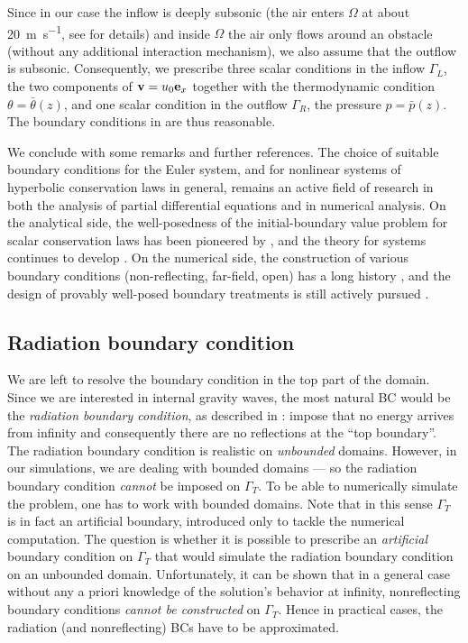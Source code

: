 \documentclass[../main.tex]{subfiles}
\begin{document}
Since in our case the inflow is deeply subsonic (the air enters $\Omega$ at about \SI{20}{\meter\per\second}, see  for details) and inside $\Omega$ the air only flows around an obstacle (without any additional interaction mechanism), we also assume that the outflow is subsonic. Consequently, we prescribe three scalar conditions in the inflow $\Gamma_L$, the two components of $\mathbf{v} = u_0 \mathbf{e}_x$ together with the thermodynamic condition $\theta = \bar{\theta}(z)$, and one scalar condition in the outflow $\Gamma_R$, the pressure $p = \bar{p}(z)$. The boundary conditions in  are thus reasonable.

We conclude with some remarks and further references. The choice of suitable boundary conditions for the Euler system, and for nonlinear systems of hyperbolic conservation laws in general, remains an active field of research in both the analysis of partial differential equations and in numerical analysis. On the analytical side, the well-posedness of the initial-boundary value problem for scalar conservation laws has been pioneered by \autocite{bardosFirstOrderQuasilinear1979}, and the theory for systems continues to develop \autocite{spinoloInformalAccountRecent2024}. On the numerical side, the construction of various boundary conditions (non-reflecting, far-field, open) has a long history \autocite{hedstromNonreflectingBoundaryConditions1979,roeRemoteBoundaryConditions1989}, and the design of provably well-posed boundary treatments is still actively pursued \autocite{nordstromOpenBoundaryConditions2025}.

\subsection{Radiation boundary condition}
\label{sec:RADIATION}

We are left to resolve the boundary condition in the top part of the domain. Since we are interested in internal gravity waves, the most natural BC would be the \emph{radiation boundary condition}, as described in : impose that no energy arrives from infinity and consequently there are no reflections at the \enquote{top boundary}. The radiation boundary condition is realistic on \emph{unbounded} domains. However, in our simulations, we are dealing with bounded domains --- so the radiation boundary condition \emph{cannot} be imposed on $\Gamma_{T}$.
To be able to numerically simulate the problem, one has to work with bounded domains. Note that in this sense $\Gamma_T$ is in fact an artificial boundary, introduced only to tackle the numerical computation. The question is whether it is possible to prescribe an \emph{artificial} boundary condition on $\Gamma_T$ that would simulate the radiation boundary condition on an unbounded domain. 
Unfortunately, it can be shown \autocite{gustafssonBoundaryConditionsTime1979,baylissRadiationBoundaryConditions1980} that in a general case without any a priori knowledge of the solution's behavior at infinity, nonreflecting boundary conditions \emph{cannot be constructed} on $\Gamma_T$. Hence in practical cases, the radiation (and nonreflecting) BCs have to be approximated.
\end{document}
